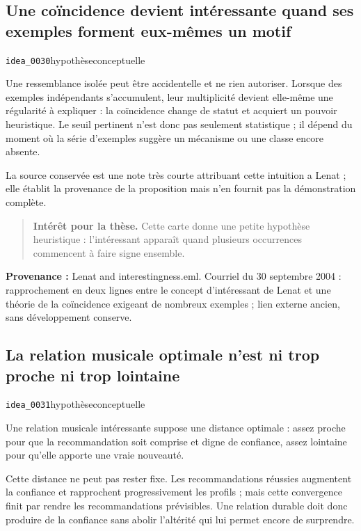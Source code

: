 \documentclass[10pt,a4paper]{article}
\begin{document}
\subsection{Une coïncidence devient intéressante quand ses exemples forment eux-mêmes un motif}
{\small\color{metadata} \texttt{idea\_0030}\quad\textbullet\quad hypothèse\quad\textbullet\quad conceptuelle\par}

Une ressemblance isolée peut être accidentelle et ne rien autoriser. Lorsque des exemples indépendants s'accumulent, leur multiplicité devient elle-même une régularité à expliquer : la coïncidence change de statut et acquiert un pouvoir heuristique. Le seuil pertinent n'est donc pas seulement statistique ; il dépend du moment où la série d'exemples suggère un mécanisme ou une classe encore absente.

La source conservée est une note très courte attribuant cette intuition a Lenat ; elle établit la provenance de la proposition mais n'en fournit pas la démonstration complète.

\begin{quote}
\textbf{Intérêt pour la thèse.} Cette carte donne une petite hypothèse heuristique : l'intéressant apparaît quand plusieurs occurrences commencent à faire signe ensemble.
\end{quote}
{\footnotesize\color{metadata}\textbf{Provenance :} Lenat and interestingness.eml. Courriel du 30 septembre 2004 : rapprochement en deux lignes entre le concept d'intéressant de Lenat et une théorie de la coïncidence exigeant de nombreux exemples ; lien externe ancien, sans développement conserve.\par}

\subsection{La relation musicale optimale n'est ni trop proche ni trop lointaine}
{\small\color{metadata} \texttt{idea\_0031}\quad\textbullet\quad hypothèse\quad\textbullet\quad conceptuelle\par}

Une relation musicale intéressante suppose une distance optimale : assez proche pour que la recommandation soit comprise et digne de confiance, assez lointaine pour qu'elle apporte une vraie nouveauté.

Cette distance ne peut pas rester fixe. Les recommandations réussies augmentent la confiance et rapprochent progressivement les profils ; mais cette convergence finit par rendre les recommandations prévisibles. Une relation durable doit donc produire de la confiance sans abolir l'altérité qui lui permet encore de surprendre.
\end{document}
